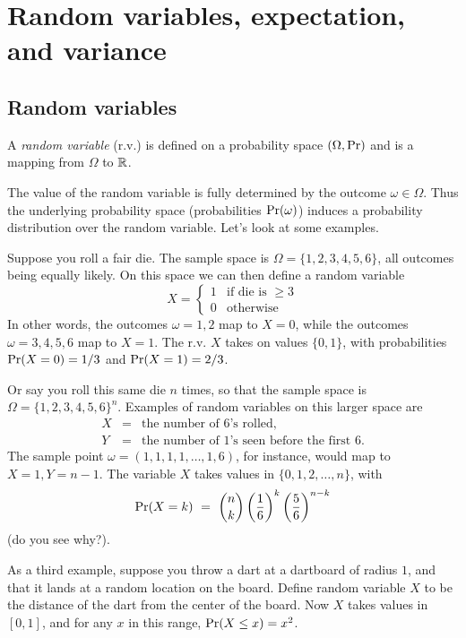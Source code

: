 \chapter{Random variables, expectation, and variance}

\section{Random variables}

A {\it random variable} (r.v.) is defined on a probability space $(\Omega, \mbox{\rm Pr})$ and 
is a mapping from $\Omega$ to $\mathbb{R}$. 

The value of the random variable is fully determined by the outcome $\omega \in \Omega$.
Thus the underlying probability space (probabilities $\mbox{\rm Pr}(\omega)$) induces a probability
distribution over the random variable. Let's look at some examples.

Suppose you roll a fair die. The sample space is $\Omega = \{1,2,3,4,5,6\}$, all outcomes 
being equally likely. On this space we can then define a random variable
$$ X = \left\{ \begin{array}{ll}
               1 & \mbox{if die is $\geq 3$} \\
               0 & \mbox{otherwise}
               \end{array} \right.$$
In other words, the outcomes $\omega = 1,2$ map to $X = 0$, while the outcomes 
$\omega = 3,4,5,6$ map to $X = 1$. The r.v. $X$ takes on values $\{0,1\}$, with 
probabilities $\mbox{\rm Pr}(X = 0) = 1/3$ and $\mbox{\rm Pr}(X=1) = 2/3$.

Or say you roll this same die $n$ times, so that the sample space is 
$\Omega = \{1,2,3,4,5,6\}^n$. Examples of random variables on this larger space are
\begin{eqnarray*}
X & = & \mbox{the number of 6's rolled,} \\
Y & = & \mbox{the number of 1's seen before the first 6.}
\end{eqnarray*}
The sample point $\omega = (1,1,1,1,\ldots,1,6)$, for instance, would map to 
$X = 1, Y = n-1$. The variable $X$ takes values in $\{0,1,2,\ldots,n\}$,
with
$$ \pr(X = k) 
\ = \ 
{n \choose k} \left(\frac{1}{6} \right)^k \left( \frac{5}{6} \right)^{n-k} $$
(do you see why?).

As a third example, suppose you throw a dart at a dartboard of radius $1$, and that it
lands at a random location on the board. Define random variable $X$ to be the distance
of the dart from the center of the board. Now $X$ takes values in $[0,1]$, and for 
any $x$ in this range, $\mbox{\rm Pr}(X \leq x) = x^2$.

